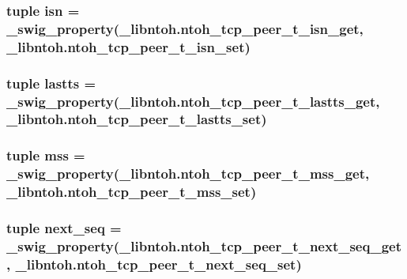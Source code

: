 \hypertarget{classlibntoh_1_1ntoh__tcp__peer__t_ab2f25f00739a355b0b11009767cebff1}{
\subsubsection[{isn}]{\setlength{\rightskip}{0pt plus 5cm}tuple isn = {\bf \-\_\-swig\-\_\-property}(\-\_\-libntoh.\-ntoh\-\_\-tcp\-\_\-peer\-\_\-t\-\_\-isn\-\_\-get, \-\_\-libntoh.\-ntoh\-\_\-tcp\-\_\-peer\-\_\-t\-\_\-isn\-\_\-set)\hspace{0.3cm}{\ttfamily [static]}}}\label{classlibntoh_1_1ntoh__tcp__peer__t_ab2f25f00739a355b0b11009767cebff1}
\hypertarget{classlibntoh_1_1ntoh__tcp__peer__t_a2858fd84349a5843a79dd5daf529c04d}{
\subsubsection[{lastts}]{\setlength{\rightskip}{0pt plus 5cm}tuple lastts = {\bf \-\_\-swig\-\_\-property}(\-\_\-libntoh.\-ntoh\-\_\-tcp\-\_\-peer\-\_\-t\-\_\-lastts\-\_\-get, \-\_\-libntoh.\-ntoh\-\_\-tcp\-\_\-peer\-\_\-t\-\_\-lastts\-\_\-set)\hspace{0.3cm}{\ttfamily [static]}}}\label{classlibntoh_1_1ntoh__tcp__peer__t_a2858fd84349a5843a79dd5daf529c04d}
\hypertarget{classlibntoh_1_1ntoh__tcp__peer__t_aecdeb465bed15a6124eddc5069330a88}{
\subsubsection[{mss}]{\setlength{\rightskip}{0pt plus 5cm}tuple mss = {\bf \-\_\-swig\-\_\-property}(\-\_\-libntoh.\-ntoh\-\_\-tcp\-\_\-peer\-\_\-t\-\_\-mss\-\_\-get, \-\_\-libntoh.\-ntoh\-\_\-tcp\-\_\-peer\-\_\-t\-\_\-mss\-\_\-set)\hspace{0.3cm}{\ttfamily [static]}}}\label{classlibntoh_1_1ntoh__tcp__peer__t_aecdeb465bed15a6124eddc5069330a88}
\hypertarget{classlibntoh_1_1ntoh__tcp__peer__t_a48a6c283c2a56902dcf6b858f9e2ec46}{
\subsubsection[{next\-\_\-seq}]{\setlength{\rightskip}{0pt plus 5cm}tuple next\-\_\-seq = {\bf \-\_\-swig\-\_\-property}(\-\_\-libntoh.\-ntoh\-\_\-tcp\-\_\-peer\-\_\-t\-\_\-next\-\_\-seq\-\_\-get, \-\_\-libntoh.\-ntoh\-\_\-tcp\-\_\-peer\-\_\-t\-\_\-next\-\_\-seq\-\_\-set)\hspace{0.3cm}{\ttfamily [static]}}}\label{classlibntoh_1_1ntoh__tcp__peer__t_a48a6c283c2a56902dcf6b858f9e2ec46}
